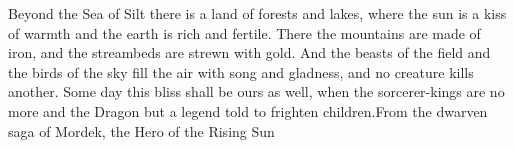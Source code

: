 {Beyond the Sea of Silt there is a land of forests and lakes, where the sun is a kiss of warmth and the earth is rich and fertile. There the mountains are made of iron, and the streambeds are strewn with gold. And the beasts of the field and the birds of the sky fill the air with song and gladness, and no creature kills another. Some day this bliss shall be ours as well, when the sorcerer-kings are no more and the Dragon but a legend told to frighten children.}{From the dwarven saga of Mordek, the Hero of the Rising Sun}




